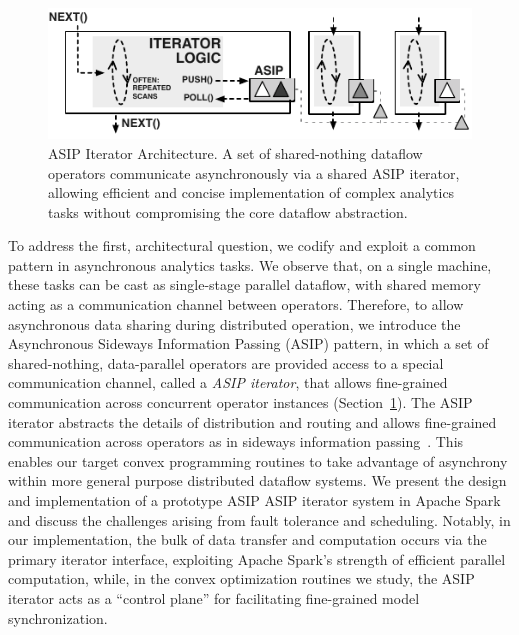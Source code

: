 \begin{figure}
\includegraphics[width=.7\linewidth]{figs/BAP-pattern.pdf}\vspace{.5em}
\caption{ASIP Iterator Architecture. A set of shared-nothing dataflow operators
  communicate asynchronously via a shared ASIP iterator, allowing
  efficient and concise implementation of complex analytics tasks
  without compromising the core dataflow abstraction.}
\label{fig:bap-architecture}
\end{figure}
To address the first, architectural question, we codify and exploit a
common pattern in asynchronous analytics tasks. We observe that, on a
single machine, these tasks can be cast as single-stage parallel
dataflow, with shared memory acting as a communication channel between
operators. Therefore, to allow asynchronous data sharing during
distributed operation, we introduce the Asynchronous Sideways
Information Passing (ASIP) pattern, in which a set of shared-nothing,
data-parallel operators are provided access to a special communication
channel, called a \textit{ASIP iterator}, that allows
fine-grained communication across concurrent operator instances (Section~\ref{fig:bap-architecture}).  The
ASIP iterator abstracts the details of distribution and routing and
allows fine-grained communication across operators as in sideways
information passing~\cite{ives-sideways}. This enables our target
convex programming routines to take advantage of asynchrony within
more general purpose distributed dataflow systems.  We present the
design and implementation of a prototype ASIP ASIP iterator
system in Apache Spark
and discuss the challenges arising from fault tolerance and
scheduling. Notably, in our implementation, the bulk of data transfer
and computation occurs via the primary iterator interface, exploiting
Apache Spark's strength of efficient parallel computation, while, in the
convex optimization routines we study, the ASIP iterator acts as a ``control plane''
for facilitating fine-grained model synchronization. %


